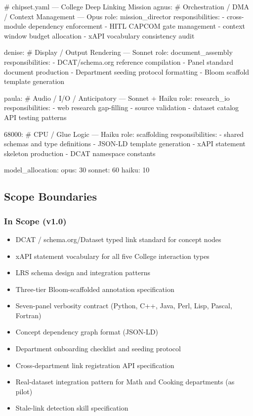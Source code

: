 \documentclass[11pt,letterpaper]{article}
\begin{document}
\begin{asciibox}
# chipset.yaml --- College Deep Linking Mission
agnus:                    # Orchestration / DMA / Context Management --- Opus
  role: mission_director
  responsibilities:
    - cross-module dependency enforcement
    - HITL CAPCOM gate management
    - context window budget allocation
    - xAPI vocabulary consistency audit

denise:                   # Display / Output Rendering --- Sonnet
  role: document_assembly
  responsibilities:
    - DCAT/schema.org reference compilation
    - Panel standard document production
    - Department seeding protocol formatting
    - Bloom scaffold template generation

paula:                    # Audio / I/O / Anticipatory --- Sonnet + Haiku
  role: research_io
  responsibilities:
    - web research gap-filling
    - source validation
    - dataset catalog API testing patterns

68000:                    # CPU / Glue Logic --- Haiku
  role: scaffolding
  responsibilities:
    - shared schemas and type definitions
    - JSON-LD template generation
    - xAPI statement skeleton production
    - DCAT namespace constants

model_allocation:
  opus:   30%
  sonnet: 60%
  haiku:  10%
\end{asciibox}

\subsection{Scope Boundaries}

\subsubsection{In Scope (v1.0)}
\begin{itemize}[noitemsep]
  \item DCAT / schema.org/Dataset typed link standard for concept nodes
  \item xAPI statement vocabulary for all five College interaction types
  \item LRS schema design and integration patterns
  \item Three-tier Bloom-scaffolded annotation specification
  \item Seven-panel verbosity contract (Python, C++, Java, Perl, Lisp, Pascal, Fortran)
  \item Concept dependency graph format (JSON-LD)
  \item Department onboarding checklist and seeding protocol
  \item Cross-department link registration API specification
  \item Real-dataset integration pattern for Math and Cooking departments (as pilot)
  \item Stale-link detection skill specification
\end{itemize}
\end{document}
